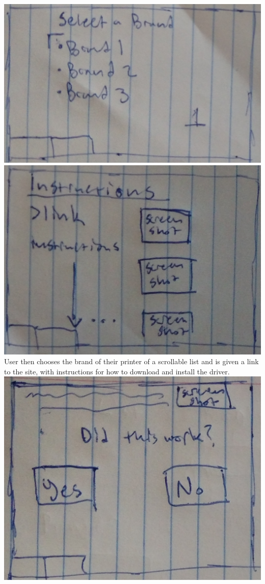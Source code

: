 \documentclass[12pt, letterpaper]{article}
\begin{document}
\begin{enumerate}
	\\\includegraphics[scale=.075]{brands.jpg}\includegraphics[scale=.075]{instructions.jpg}
	\\User then chooses the brand of their printer of a scrollable list and is given a link to the site, with instructions for how to download and install the driver.
	\\\includegraphics[scale=.075]{work.jpg} 

\end{enumerate}
\end{document}
